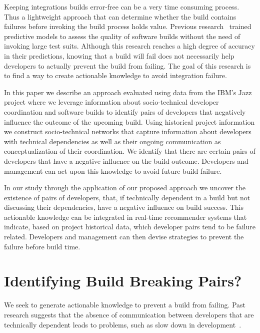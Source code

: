 \documentclass[conference]{IEEEtran}
\begin{document}
Keeping integrations builds error-free can be a very time consuming
process. 
Thus a lightweight approach that can determine whether the build contains
failures before invoking the build process holds value. Previous
research~\cite{wolf:icse:2009,hassan:ase:2006} trained predictive models to assess the quality of software builds without the need of invoking large test
suits. Although this research
reaches a high degree of accuracy in their predictions, knowing that a
build will fail does not necessarily help developers to actually prevent
the build from failing.
The goal of this research is to find a way to create actionable knowledge to avoid
integration failure.

In this paper we describe an approach evaluated using data from the IBM's Jazz project where we leverage
information about socio-technical developer coordination and software builds to
identify pairs of developers that negatively influence the outcome of the
upcoming build. Using historical project information we construct socio-technical
networks that capture information about developers with technical dependencies
as well as their ongoing communication as conceptualization of their coordination.
We identify that there are certain pairs of developers that have a
negative influence on the build outcome. Developers and management can
act upon this knowledge to avoid future build failure.

In our study through the application of our proposed approach we uncover the existence of pairs of
developers, that, if technically dependent in a build but not discussing their
dependencies, have a negative influence on build success. This
actionable knowledge can be integrated in real-time recommender systems that
indicate, based on project historical data, which developer pairs tend to be
failure related. Developers and management can then devise strategies to
prevent the failure before build time. 



\section{Identifying Build Breaking Pairs?}
\label{sec:pattern}
We seek to generate actionable knowledge to
prevent a build from failing. Past research suggests that the absence of
communication between developers that are technically dependent leads to
problems, such as slow down in development~\cite{cataldo:esem:2008}.
\end{document}
